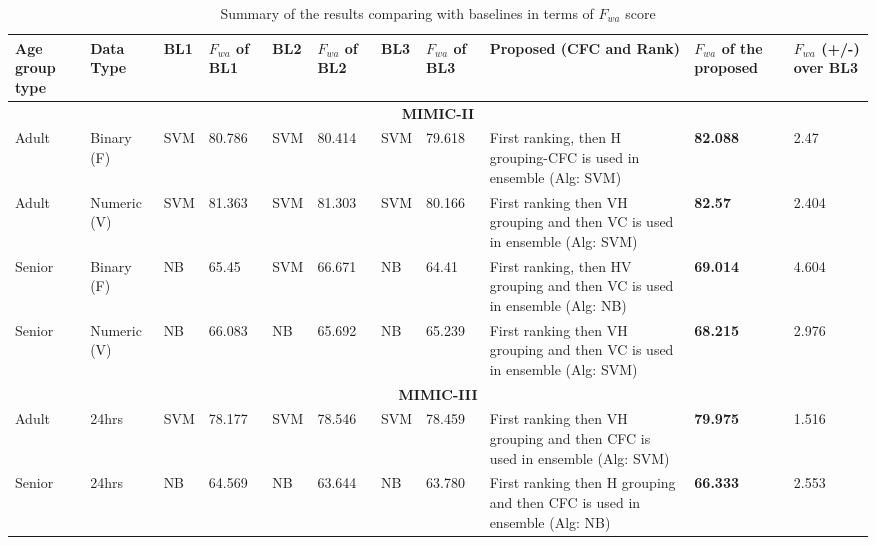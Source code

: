 \begin{table}[h] 
	\centering \caption{Summary of the results comparing with baselines in terms of $F_{wa}$ score} 
	\begin{tabular}{|p{0.8cm}|p{1cm}|p{0.6cm}|p{0.8cm}|p{0.6cm}|p{0.8cm}|p{0.6cm}|p{0.8cm}|p{5.0cm}|p{1cm}|p{0.7cm}|}\hline	
		Age group type & Data Type & BL1 & $F_{wa}$ of BL1 & BL2 & $F_{wa}$ of BL2 & BL3 & $F_{wa}$ of BL3 & Proposed (CFC and Rank) & $F_{wa}$ of the proposed & $F_{wa}$ (+/-) over BL3 \\\hline		
		
		\multicolumn{11}{|c|}{\textbf{MIMIC-II}} \\\hline
		Adult & Binary (F) &	SVM	& 80.786 & SVM	& 80.414 &	SVM & 79.618 & First ranking, then H grouping-CFC is used in ensemble (Alg: SVM)	& \textbf{82.088}	& 2.47 \\\hline
		Adult & Numeric (V)	& SVM &	81.363 & SVM & 81.303 & SVM & 80.166 &	First ranking then VH grouping and then VC is used in ensemble (Alg: SVM) &	\textbf{82.57} & 2.404 \\\hline
		Senior & Binary (F) & NB & 65.45 & SVM & 66.671 & NB & 64.41 & First ranking, then HV grouping  and then VC is used in ensemble  (Alg: NB) & \textbf{69.014} &  4.604 \\\hline
		Senior & Numeric (V) & NB & 66.083 & NB & 65.692 & NB & 65.239 & First ranking then VH grouping and then VC is used in ensemble (Alg: SVM) &	\textbf{68.215} & 2.976 \\\hline
		
		\multicolumn{11}{|c|}{\textbf{MIMIC-III}} \\\hline	
		Adult & 24hrs & SVM & 78.177 & SVM & 78.546 & SVM & 78.459 & First ranking then VH grouping and then CFC is used in ensemble (Alg: SVM) &	\textbf{79.975} &  1.516 \\\hline
		Senior & 24hrs & NB & 64.569 & NB & 63.644 & NB & 63.780 & First ranking then H grouping and then CFC is used in ensemble (Alg: NB) &	\textbf{66.333}	& 2.553 \\\hline
		
	\end{tabular}
	\label{t:Summary_of_results_with_all_baselines}
\end{table}



